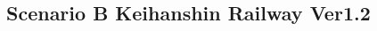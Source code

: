 \documentclass{article}
\begin{document}
\begin{CJK}{UTF8}{min}





















\section*{Scenario B Keihanshin Railway Ver1.2}


\end{CJK}
\end{document}
